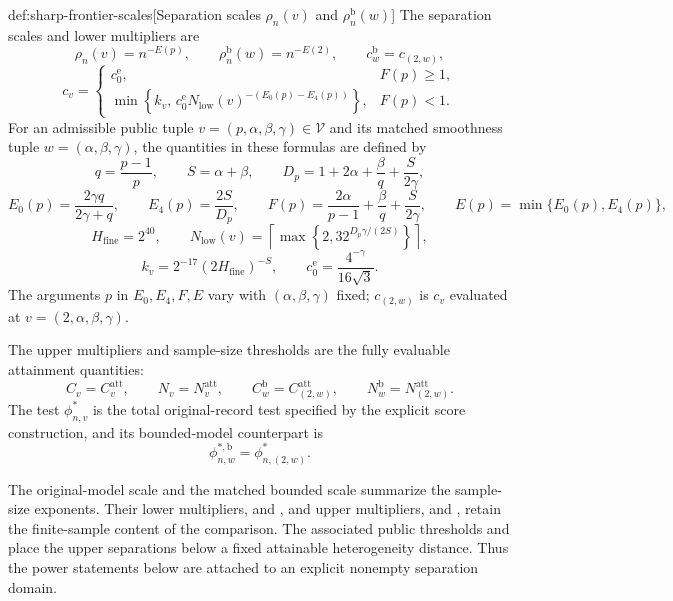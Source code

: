 \documentclass[11pt]{article}
\begin{document}
\begin{definitionv}{def:sharp-frontier-scales}[Separation scales \(\rho_n(v)\) and \(\rho_n^{\mathrm b}(w)\)]
The separation scales and lower multipliers are
\[
 \rho_n(v)=n^{-E(p)},\qquad
 \rho_n^{\mathrm b}(w)=n^{-E(2)},\qquad
 c_w^{\mathrm b}=c_{(2,w)},
\]
\[
 c_v=
 \begin{cases}
 c_0^{\mathrm e},&F(p)\ge1,\\
 \min\!\left\{k_v,\,
 c_0^{\mathrm e}N_{\mathrm{low}}(v)^{-(E_0(p)-E_4(p))}\right\},
 &F(p)<1.
 \end{cases}
\]
For an admissible public tuple \(v=(p,\alpha,\beta,\gamma)\in\mathcal V\) and its matched smoothness tuple \(w=(\alpha,\beta,\gamma)\), the quantities in these formulas are defined by
\[
 q=\frac{p-1}{p},\qquad S=\alpha+\beta,\qquad
 D_p=1+2\alpha+\frac{\beta}{q}+\frac{S}{2\gamma},
\]
\[
 E_0(p)=\frac{2\gamma q}{2\gamma+q},\qquad
 E_4(p)=\frac{2S}{D_p},\qquad
 F(p)=\frac{2\alpha}{p-1}+\frac{\beta}{q}+\frac{S}{2\gamma},
 \qquad E(p)=\min\{E_0(p),E_4(p)\},
\]
\[
 H_{\mathrm{fine}}=2^{40},\qquad
 N_{\mathrm{low}}(v)=
 \left\lceil\max\left\{2,32^{D_p\gamma/(2S)}\right\}\right\rceil,
\]
\[
 k_v=2^{-17}(2H_{\mathrm{fine}})^{-S},\qquad
 c_0^{\mathrm e}=\frac{4^{-\gamma}}{16\sqrt3}.
\]
The arguments \(p\) in \(E_0,E_4,F,E\) vary with \((\alpha,\beta,\gamma)\) fixed; \(c_{(2,w)}\) is \(c_v\) evaluated at \(v=(2,\alpha,\beta,\gamma)\).

The upper multipliers and sample-size thresholds are the fully evaluable attainment quantities:
\[
 C_v=C^{\mathrm{att}}_v,\qquad N_v=N^{\mathrm{att}}_v,\qquad
 C_w^{\mathrm b}=C^{\mathrm{att}}_{(2,w)},\qquad
 N_w^{\mathrm b}=N^{\mathrm{att}}_{(2,w)}.
\]
The test \(\phi^*_{n,v}\) is the total original-record test specified by the explicit score construction, and its bounded-model counterpart is
\[
 \phi^{*,\mathrm b}_{n,w}=\phi^*_{n,(2,w)}.
\]
\end{definitionv}

The original-model scale  and the matched bounded scale  summarize the sample-size exponents. Their lower multipliers,  and , and upper multipliers,  and , retain the finite-sample content of the comparison. The associated public thresholds  and  place the upper separations below a fixed attainable heterogeneity distance. Thus the power statements below are attached to an explicit nonempty separation domain.
\end{document}
